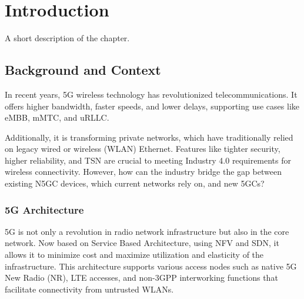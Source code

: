 \chapter{Introduction}%
\label{chapter:introduction}

\begin{introduction}
A short description of the chapter.
\end{introduction}

\section{Background and Context}


In recent years, \ac{5G} wireless technology has revolutionized telecommunications. It offers higher bandwidth, faster speeds, and lower delays, supporting use cases like \ac{eMBB}, \ac{mMTC}, and \ac{uRLLC}.

Additionally, it is transforming private networks, which have traditionally relied on legacy wired or wireless (WLAN) Ethernet. Features like tighter security, higher reliability, and \ac{TSN} are crucial to meeting Industry 4.0 requirements for wireless connectivity. However, how can the industry bridge the gap between existing \ac{N5GC} devices, which current networks rely on, and new \acp{5GC}?

\subsection{5G Architecture}


5G is not only a revolution in radio network infrastructure but also in the core network. Now based on Service Based Architecture, using \ac{NFV} and \ac{SDN}, it allows it to minimize cost and maximize utilization and elasticity of the infrastructure. This architecture supports various access nodes such as native 5G New Radio (NR), LTE accesses, and non-3GPP interworking functions that facilitate connectivity from untrusted WLANs.

